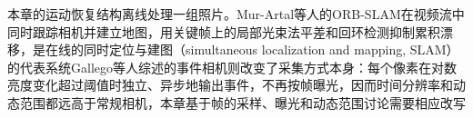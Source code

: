 本章的运动恢复结构离线处理一组照片。Mur-Artal等人的ORB-SLAM在视频流中同时跟踪相机并建立地图，用关键帧上的局部光束法平差和回环检测抑制累积漂移，是在线的同时定位与建图（simultaneous localization and mapping, SLAM）的代表系统Gallego等人综述的事件相机则改变了采集方式本身：每个像素在对数亮度变化超过阈值时独立、异步地输出事件，不再按帧曝光，因而时间分辨率和动态范围都远高于常规相机，本章基于帧的采样、曝光和动态范围讨论需要相应改写
